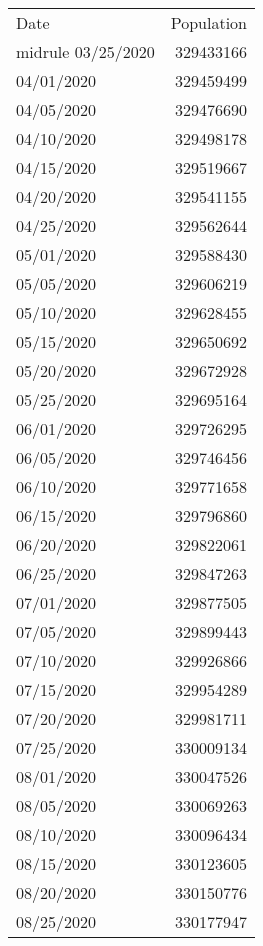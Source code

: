 \begin{table}[h]
        \centering
        \begin{tabular}{lr}
        \toprule
        Date	        &		Population \\midrule
        03/25/2020		&		329433166 \\
        04/01/2020		&		329459499 \\
        04/05/2020		&		329476690 \\
        04/10/2020		&		329498178 \\
        04/15/2020		&		329519667 \\
        04/20/2020		&		329541155 \\
        04/25/2020		&		329562644 \\
        05/01/2020		&		329588430 \\
        05/05/2020		&		329606219 \\
        05/10/2020		&		329628455 \\
        05/15/2020		&		329650692 \\
        05/20/2020		&		329672928 \\
        05/25/2020		&		329695164 \\
        06/01/2020		&		329726295 \\
        06/05/2020		&		329746456 \\
        06/10/2020		&		329771658 \\
        06/15/2020		&		329796860 \\
        06/20/2020		&		329822061 \\
        06/25/2020		&		329847263 \\
        07/01/2020		&		329877505 \\
        07/05/2020		&		329899443 \\
        07/10/2020		&		329926866 \\
        07/15/2020		&		329954289 \\
        07/20/2020		&		329981711 \\
        07/25/2020		&		330009134 \\
        08/01/2020		&		330047526 \\
        08/05/2020		&		330069263 \\
        08/10/2020		&		330096434 \\
        08/15/2020		&		330123605 \\
        08/20/2020		&		330150776 \\
        08/25/2020		&		330177947 \\

\end{tabular}
\end{table}

